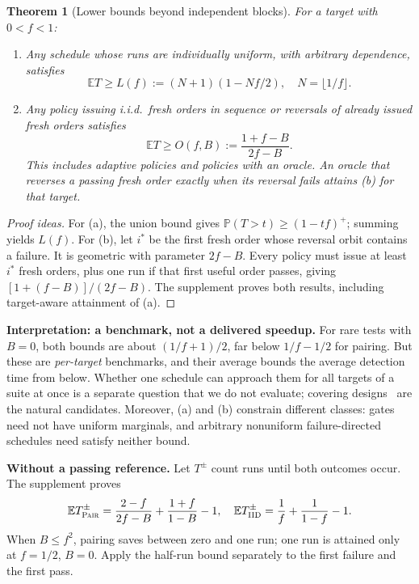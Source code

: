 \documentclass[conference,letterpaper]{IEEEtran}
\newtheorem{theorem}{Theorem}
\theoremstyle{definition}
\newcommand{\Prb}{\mathbb{P}}
\newcommand{\E}{\mathbb{E}}
\newcommand{\IIDp}{\textup{\textsc{IID}}}
\newcommand{\PAIRp}{\textup{\textsc{Pair}}}
\begin{document}
\begin{theorem}[Lower bounds beyond independent blocks]\label{thm:uniform}\label{thm:oracle}
For a target with $0<f<1$:
\begin{enumerate}
\item[(a)] Any schedule whose runs are individually uniform, with arbitrary dependence, satisfies
\[
\E T\ge L(f):=(N+1)(1-Nf/2),\quad N=\lfloor1/f\rfloor.
\]
\item[(b)] Any policy issuing i.i.d.\ fresh orders in sequence or reversals of already issued fresh orders satisfies
\[
\E T\ge O(f,B):=\frac{1+f-B}{2f-B}.
\]
This includes adaptive policies and policies with an oracle. An oracle that reverses a passing fresh order exactly when its reversal fails attains (b) for that target.
\end{enumerate}
\end{theorem}
\begin{proof}[Proof ideas]
For (a), the union bound gives $\Prb(T>t)\ge(1-tf)^+$; summing yields $L(f)$. For (b), let $i^*$ be the first fresh order whose reversal orbit contains a failure. It is geometric with parameter $2f-B$. Every policy must issue at least $i^*$ fresh orders, plus one run if that first useful order passes, giving $[1+(f-B)]/(2f-B)$. The supplement proves both results, including target-aware attainment of (a).
\end{proof}
\textbf{Interpretation: a benchmark, not a delivered speedup.} For rare tests with $B=0$, both bounds are about $(1/f+1)/2$, far below $1/f-1/2$ for pairing. But these are \emph{per-target} benchmarks, and their average bounds the average detection time from below. Whether one schedule can approach them for all targets of a suite at once is a separate question that we do not evaluate; covering designs~\cite{wei2021tacas,li2023issta} are the natural candidates. Moreover, (a) and (b) constrain different classes: gates need not have uniform marginals, and arbitrary nonuniform failure-directed schedules need satisfy neither bound.

\textbf{Without a passing reference.} Let $T^{\pm}$ count runs until both outcomes occur. The supplement proves
\begin{equation}\label{thm:both}
\E T^{\pm}_{\PAIRp}=\frac{2-f}{2f-B}+\frac{1+f}{1-B}-1,\quad
\E T^{\pm}_{\IIDp}=\frac1f+\frac1{1-f}-1.
\end{equation}
When $B\le f^2$, pairing saves between zero and one run; one run is attained only at $f=1/2$, $B=0$. Apply the half-run bound separately to the first failure and the first pass.
\end{document}
